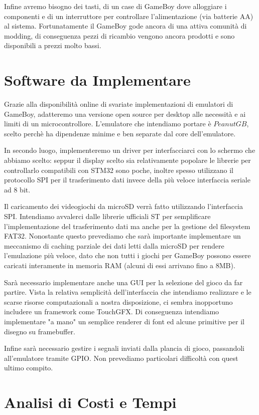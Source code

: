 \documentclass[12pt]{article}
\begin{document}
Infine avremo bisogno dei tasti, di un case di GameBoy dove alloggiare i
componenti e di un interruttore per controllare l'alimentazione
(via batterie AA) al sistema.
Fortunatamente il GameBoy gode ancora di una attiva comunità di modding,
di conseguenza pezzi di ricambio vengono ancora prodotti e sono disponibili
a prezzi molto bassi.

\section{Software da Implementare}
Grazie alla disponibilità online di svariate implementazioni di emulatori di
GameBoy, adatteremo una versione open source per desktop alle necessità e ai
limiti di un microcontrollore. L'emulatore che intendiamo portare è $PeanutGB$,
scelto perchè ha dipendenze minime e ben separate dal core dell'emulatore.

In secondo luogo, implementeremo un driver per interfacciarci con lo schermo
che abbiamo scelto: seppur il display scelto sia relativamente popolare
le librerie per controllarlo compatibili con STM32 sono poche, inoltre spesso
utilizzano il protocollo SPI per il trasferimento dati invece della più veloce
interfaccia seriale ad 8 bit.

Il caricamento dei videogiochi da microSD verrà fatto utilizzando l'interfaccia
SPI. Intendiamo avvalerci dalle librerie ufficiali ST per semplificare
l'implementazione del trasferimento dati ma anche per la gestione del filesystem
FAT32. Nonostante questo prevediamo che sarà importante implementare un
meccanismo di caching parziale dei dati letti dalla microSD per rendere
l'emulazione più veloce, dato che non tutti i giochi per GameBoy possono essere
caricati interamente in memoria RAM (alcuni di essi arrivano fino a 8MB).

Sarà necessario implementare anche una GUI per la selezione del gioco da far
partire. Vista la relativa semplicità dell'interfaccia che intendiamo realizzare
e le scarse risorse computazionali a nostra disposizione, ci sembra inopportuno
includere un framework come TouchGFX.
Di conseguenza intendiamo implementare "a mano" un semplice renderer di font ed
alcune primitive per il disegno su framebuffer.

Infine sarà necessario gestire i segnali inviati dalla plancia di gioco,
passandoli all'emulatore tramite GPIO.
Non prevediamo particolari difficoltà con quest ultimo compito. 

\section{Analisi di Costi e Tempi}
\end{document}
